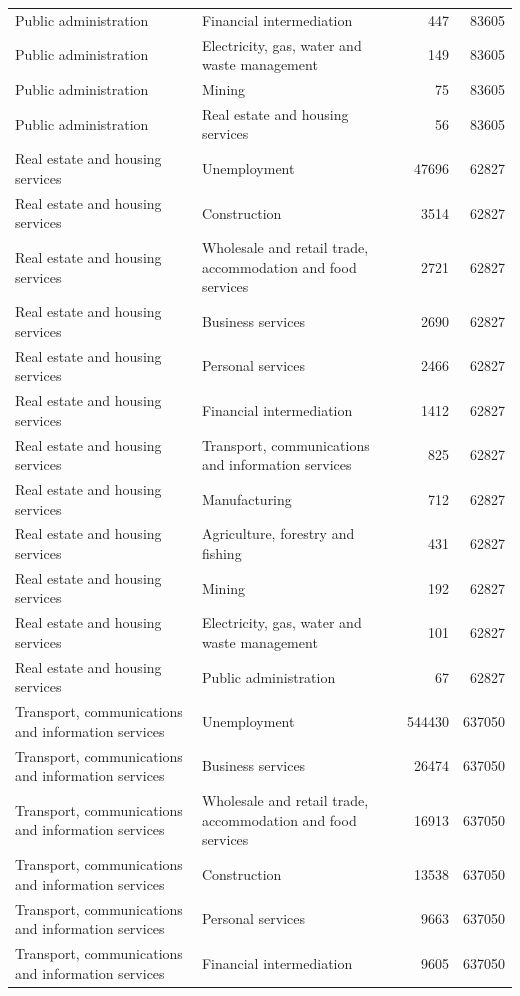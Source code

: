 \begin{longtable}{llrr}
Public administration & Financial intermediation & 447 & 83605 \\
Public administration & Electricity, gas, water and waste management & 149 & 83605 \\
Public administration & Mining & 75 & 83605 \\
Public administration & Real estate and housing services & 56 & 83605 \\
Real estate and housing services & Unemployment & 47696 & 62827 \\
Real estate and housing services & Construction & 3514 & 62827 \\
Real estate and housing services & Wholesale and retail trade, accommodation and food services & 2721 & 62827 \\
Real estate and housing services & Business services & 2690 & 62827 \\
Real estate and housing services & Personal services & 2466 & 62827 \\
Real estate and housing services & Financial intermediation & 1412 & 62827 \\
Real estate and housing services & Transport, communications and information services & 825 & 62827 \\
Real estate and housing services & Manufacturing & 712 & 62827 \\
Real estate and housing services & Agriculture, forestry and fishing & 431 & 62827 \\
Real estate and housing services & Mining & 192 & 62827 \\
Real estate and housing services & Electricity, gas, water and waste management & 101 & 62827 \\
Real estate and housing services & Public administration & 67 & 62827 \\
Transport, communications and information services & Unemployment & 544430 & 637050 \\
Transport, communications and information services & Business services & 26474 & 637050 \\
Transport, communications and information services & Wholesale and retail trade, accommodation and food services & 16913 & 637050 \\
Transport, communications and information services & Construction & 13538 & 637050 \\
Transport, communications and information services & Personal services & 9663 & 637050 \\
Transport, communications and information services & Financial intermediation & 9605 & 637050 \\

\end{longtable}
